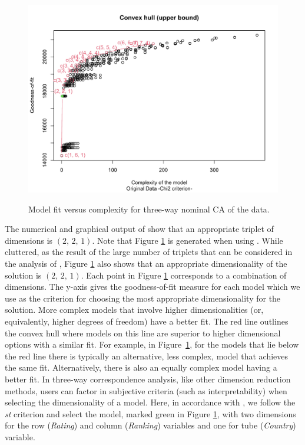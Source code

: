 \begin{figure}[h]
	\begin{center}
{\includegraphics*[width = 1 \textwidth]{ca3tune.pdf}}
		\caption{\label{fig:ca3tune} Model fit versus complexity for three-way nominal CA of the  data.}
	\end{center}
\end{figure}

The numerical and graphical output of  show that an appropriate triplet of dimensions is $\left(2,\, 2,\, 1\right)$. 
Note that Figure \ref{fig:ca3tune} is generated when using . While cluttered, as the result of the large number of triplets that can be considered in the analysis of ,  Figure \ref{fig:ca3tune} also shows that an appropriate dimensionality of the solution is  $\left(2,\,2,\,1\right)$.
Each point in Figure \ref{fig:ca3tune} corresponds to a combination of dimensions. The y-axis gives the goodness-of-fit measure for each model which we use as the criterion for choosing the most appropriate dimensionality for the solution. More complex models that involve higher dimensionalities (or, equivalently, higher degrees of freedom) have a better fit. The red line outlines the convex hull where models on this line are superior to higher dimensional options with a similar fit. For example, in Figure~\ref{fig:ca3tune}, for the models that lie below the red line there is typically an alternative, less complex, model that achieves the same fit. Alternatively, there is also an equally complex model having a better fit. In three-way correspondence analysis, like other dimension reduction methods, users can factor in subjective criteria (such as interpretability) when selecting the dimensionality of a model. Here, in accordance with  \cite{ceukie06}, we follow the {\it st} criterion and select the model, marked green in Figure \ref{fig:ca3tune}, with two dimensions for the row ({\it Rating}) and column ({\it Ranking}) variables and one for tube ({\it Country}) variable.


